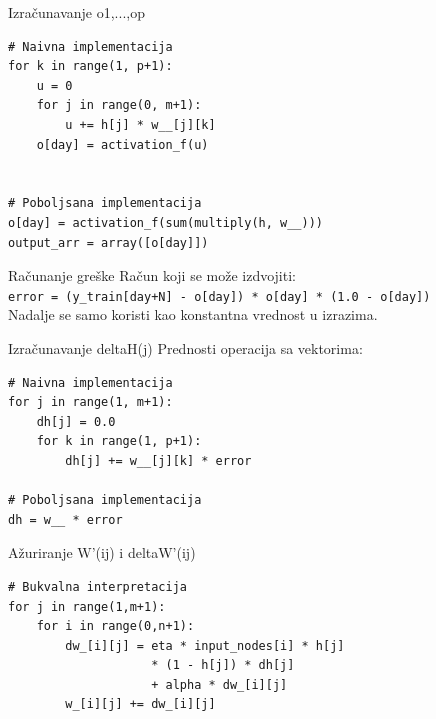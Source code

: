 \documentclass{beamer}
\begin{document}
\begin{frame}[fragile]{Izračunavanje o1,...,op}
\begin{verbatim}
# Naivna implementacija
for k in range(1, p+1):
    u = 0
    for j in range(0, m+1):
        u += h[j] * w__[j][k]
    o[day] = activation_f(u)


# Poboljsana implementacija
o[day] = activation_f(sum(multiply(h, w__)))
output_arr = array([o[day]])
\end{verbatim}
\end{frame}

\begin{frame}{Računanje greške}
    Račun koji se može izdvojiti:\vspace{1cm}
    \\
    \texttt{error = (y\_train[day+N] - o[day]) * o[day] * (1.0 - o[day])}
    \vspace{1cm}
    \\
    Nadalje se samo koristi kao konstantna vrednost u izrazima.
\end{frame}


\begin{frame}[fragile]{Izračunavanje deltaH(j)}
Prednosti operacija sa vektorima:
\begin{verbatim}
# Naivna implementacija
for j in range(1, m+1):
    dh[j] = 0.0
    for k in range(1, p+1):
        dh[j] += w__[j][k] * error
        
# Poboljsana implementacija
dh = w__ * error
\end{verbatim}
\end{frame}


\begin{frame}[fragile]{Ažuriranje W'(ij) i deltaW'(ij)}
\begin{verbatim}
# Bukvalna interpretacija
for j in range(1,m+1):    
    for i in range(0,n+1): 
        dw_[i][j] = eta * input_nodes[i] * h[j] 
                    * (1 - h[j]) * dh[j] 
                    + alpha * dw_[i][j] 
        w_[i][j] += dw_[i][j]
\end{verbatim}
\end{frame}
\end{document}
